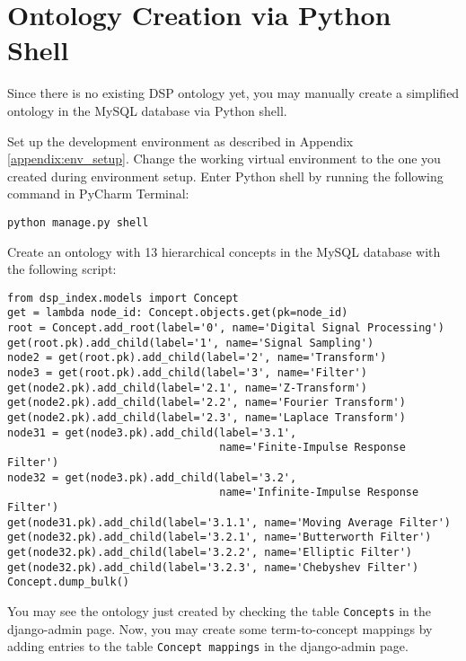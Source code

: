 \chapter{Ontology Creation via Python Shell}
\label{appendix:onto_create}

Since there is no existing DSP ontology yet, you may manually create a simplified ontology in the MySQL database via Python shell.

Set up the development environment as described in Appendix \ref{appendix:env_setup}. Change the working virtual environment to the one you created during environment setup. Enter Python shell by running the following command in PyCharm Terminal:
\begin{verbatim}
python manage.py shell
\end{verbatim}

Create an ontology with 13 hierarchical concepts in the MySQL database with the following script:

\begin{verbatim}
from dsp_index.models import Concept
get = lambda node_id: Concept.objects.get(pk=node_id)
root = Concept.add_root(label='0', name='Digital Signal Processing')
get(root.pk).add_child(label='1', name='Signal Sampling')
node2 = get(root.pk).add_child(label='2', name='Transform')
node3 = get(root.pk).add_child(label='3', name='Filter')
get(node2.pk).add_child(label='2.1', name='Z-Transform')
get(node2.pk).add_child(label='2.2', name='Fourier Transform')
get(node2.pk).add_child(label='2.3', name='Laplace Transform')
node31 = get(node3.pk).add_child(label='3.1', 
                                 name='Finite-Impulse Response Filter')
node32 = get(node3.pk).add_child(label='3.2', 	
                                 name='Infinite-Impulse Response Filter')
get(node31.pk).add_child(label='3.1.1', name='Moving Average Filter')
get(node32.pk).add_child(label='3.2.1', name='Butterworth Filter')
get(node32.pk).add_child(label='3.2.2', name='Elliptic Filter')
get(node32.pk).add_child(label='3.2.3', name='Chebyshev Filter')
Concept.dump_bulk()
\end{verbatim}

You may see the ontology just created by checking the table \texttt{Concepts} in the django-admin page. Now, you may create some term-to-concept mappings by adding entries to the table \texttt{Concept mappings} in the django-admin page.


